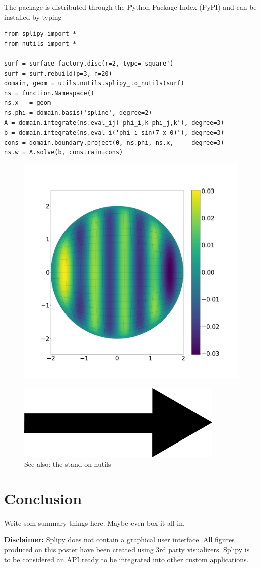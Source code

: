 \documentclass[landscape]{sintefposter}
\begin{document}
\begin{multicols}{3}
\begin{tcolorbox}[colback=white,colframe=sintefblue,title=Integration with Nutils]
  The package is distributed through the Python Package Index (PyPI) and can be installed by typing
  \begin{tcolorbox}[colback=sinteflightgrey]
  \begin{Verbatim}[fontsize=\small]
from splipy import *
from nutils import *

surf = surface_factory.disc(r=2, type='square')
surf = surf.rebuild(p=3, n=20)
domain, geom = utils.nutils.splipy_to_nutils(surf)
ns = function.Namespace()
ns.x   = geom
ns.phi = domain.basis('spline', degree=2)
A = domain.integrate(ns.eval_ij('phi_i,k phi_j,k'), degree=3)
b = domain.integrate(ns.eval_i('phi_i sin(7 x_0)'), degree=3)
cons = domain.boundary.project(0, ns.phi, ns.x,     degree=3)
ns.w = A.solve(b, constrain=cons)\end{Verbatim}
  \end{tcolorbox}
  \begin{figure}
    \begin{center}
      \includegraphics[width=0.4\linewidth]{nutilssolution} \\
    \end{center}
  \end{figure}
  \begin{figure}
    \begin{center}
      \includegraphics[width=0.2\linewidth]{right.png} \\
      See also: the stand on nutils
    \end{center}
  \end{figure}
\end{tcolorbox}

\section{Conclusion}

Write som summary things here.
Maybe even box it all in.

{\small \textbf{Disclaimer:}
Splipy does not contain a graphical user interface.
All figures produced on this poster have been created using 3rd party visualizers.
Splipy is to be considered an API ready to be integrated into other custom applications.
}

\end{multicols}
\end{document}
